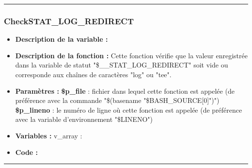 \documentclass[a4paper,10pt]{article}
\begin{document}
\color{blue}\par\noindent\rule{\textwidth}{0.4pt}\color{white}

\color{blue}
\subsubsection{CheckSTAT\_LOG\_REDIRECT}\color{white}
\begin{itemize}
    \item \textbf{Description de la variable :}

    \item \textbf{Description de la fonction :} Cette fonction vérifie que la valeur enregistrée dans la variable de statut "\$\_\_STAT\_LOG\_REDIRECT" soit vide ou corresponde aux chaînes de caractères "log" ou "tee".

    \item \textbf{Paramètres :}
        \color{orange}\textbf{\$p\_file}\color{white} : fichier dans lequel cette fonction est appelée (de préférence avec la commande "\$(\color{gray}basename \color{white}"\color{orange}\$BASH\_SOURCE[0]\color{white}")")
    \color{orange}\textbf{\$p\_lineno}\color{white} : le numéro de ligne où cette fonction est appelée (de préférence avec la variable d'environnement "\color{orange}\$LINENO\color{white}")

    \item \textbf{Variables :} v\_array :

    \item \textbf{Code :}
\end{itemize}



\color{blue}\par\noindent\rule{\textwidth}{0.4pt}\color{white}

\color{blue}
\end{document}
